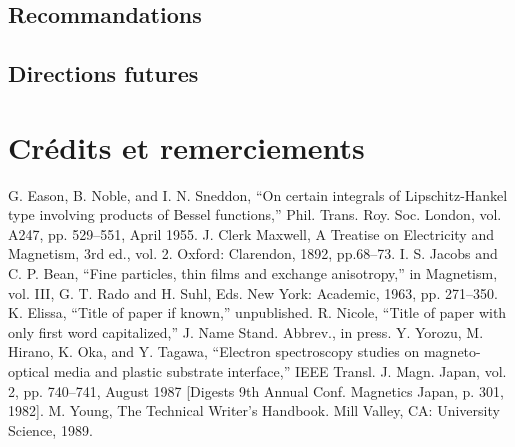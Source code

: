 \documentclass[conference]{IEEEtran}
\begin{document}
\subsection{Recommandations}

\subsection{Directions futures}

\section{Crédits et remerciements}

\begin{thebibliography}{00}
 G. Eason, B. Noble, and I. N. Sneddon, ``On certain integrals of Lipschitz-Hankel type involving products of Bessel functions,'' Phil. Trans. Roy. Soc. London, vol. A247, pp. 529--551, April 1955.
 J. Clerk Maxwell, A Treatise on Electricity and Magnetism, 3rd ed., vol. 2. Oxford: Clarendon, 1892, pp.68--73.
 I. S. Jacobs and C. P. Bean, ``Fine particles, thin films and exchange anisotropy,'' in Magnetism, vol. III, G. T. Rado and H. Suhl, Eds. New York: Academic, 1963, pp. 271--350.
 K. Elissa, ``Title of paper if known,'' unpublished.
 R. Nicole, ``Title of paper with only first word capitalized,'' J. Name Stand. Abbrev., in press.
 Y. Yorozu, M. Hirano, K. Oka, and Y. Tagawa, ``Electron spectroscopy studies on magneto-optical media and plastic substrate interface,'' IEEE Transl. J. Magn. Japan, vol. 2, pp. 740--741, August 1987 [Digests 9th Annual Conf. Magnetics Japan, p. 301, 1982].
 M. Young, The Technical Writer's Handbook. Mill Valley, CA: University Science, 1989.
\end{thebibliography}
\end{document}
